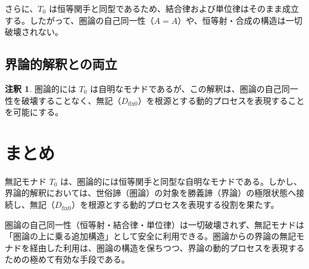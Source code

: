 \documentclass[11pt,a4paper]{article}
\theoremstyle{definition}
\newtheorem{remark}{注釈}[section]
\newcommand{\dfix}{D_{\mathrm{fix}0}} %
\begin{document}
さらに、$T_0$ は恒等関手と同型であるため、結合律および単位律はそのまま成立する。したがって、圏論の自己同一性（$A = A$）や、恒等射・合成の構造は一切破壊されない。

\subsection{界論的解釈との両立}
\begin{remark}
圏論的には $T_0$ は自明なモナドであるが、この解釈は、圏論の自己同一性を破壊することなく、無記（$\dfix$）を根源とする動的プロセスを表現することを可能にする。
\end{remark}

\section{まとめ}
無記モナド $T_0$ は、圏論的には恒等関手と同型な自明なモナドである。しかし、界論的解釈においては、世俗諦（圏論）の対象を勝義諦（界論）の極限状態へ接続し、無記（$\dfix$）を根源とする動的プロセスを表現する役割を果たす。

圏論の自己同一性（恒等射・結合律・単位律）は一切破壊されず、無記モナドは「圏論の上に乗る追加構造」として安全に利用できる。圏論からの界論の無記モナドを経由した利用は、圏論の構造を保ちつつ、界論の動的プロセスを表現するための極めて有効な手段である。
\end{document}
